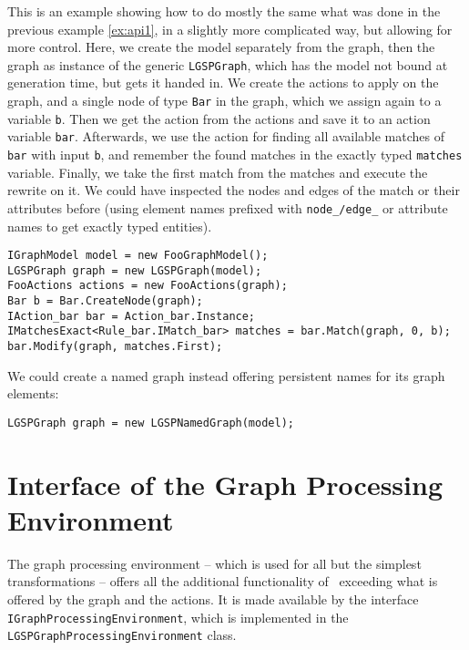 \begin{example}
This is an example showing how to do mostly the same what was done in the previous example \ref{ex:api1}, in a slightly more complicated way, but allowing for more control.
Here, we create the model separately from the graph, then the graph as instance of the generic \texttt{LGSPGraph}, which has the model not bound at generation time, but gets it handed in.
We create the actions to apply on the graph, and a single node of type \texttt{Bar} in the graph, which we assign again to a variable \texttt{b}.
Then we get the action from the actions and save it to an action variable \texttt{bar}.
Afterwards, we use the action for finding all available matches of \texttt{bar} with input \texttt{b}, and remember the found matches in the exactly typed \texttt{matches} variable.
Finally, we take the first match from the matches and execute the rewrite on it.
We could have inspected the nodes and edges of the match or their attributes before (using element names prefixed with \texttt{node\_/edge\_} or attribute names to get exactly typed entities). 
\begin{verbatim}
IGraphModel model = new FooGraphModel();
LGSPGraph graph = new LGSPGraph(model);
FooActions actions = new FooActions(graph);
Bar b = Bar.CreateNode(graph);
IAction_bar bar = Action_bar.Instance;
IMatchesExact<Rule_bar.IMatch_bar> matches = bar.Match(graph, 0, b);
bar.Modify(graph, matches.First);
\end{verbatim}

We could create a named graph instead offering persistent names for its graph elements:
\begin{verbatim}
LGSPGraph graph = new LGSPNamedGraph(model);
\end{verbatim}
\end{example}

\section{Interface of the Graph Processing Environment}\label{sec:procenv}

The graph processing environment -- which is used for all but the simplest transformations -- offers all the additional functionality of \GrG~exceeding what is offered by the graph and the actions.
It is made available by the interface \texttt{IGraphProcessingEnvironment}, which is implemented in the \texttt{LGSPGraphProcessing\-Environment} class.

